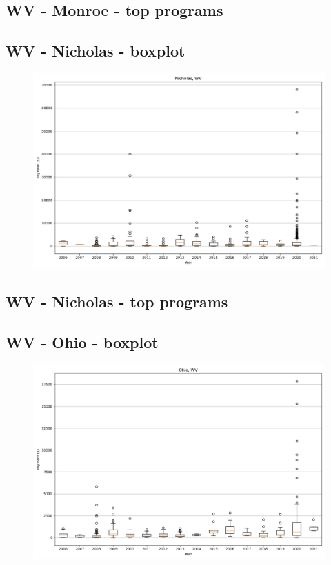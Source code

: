 \subsection*{WV - Monroe - top programs}

\newpage
\subsection*{WV - Nicholas - boxplot}
\begin{figure}[h]
\centering
\includegraphics[width=7in]{../output/boxplots/counties/Nicholas-WV_boxplot.png}
\end{figure}


\subsection*{WV - Nicholas - top programs}

\newpage
\subsection*{WV - Ohio - boxplot}
\begin{figure}[h]
\centering
\includegraphics[width=7in]{../output/boxplots/counties/Ohio-WV_boxplot.png}
\end{figure}


